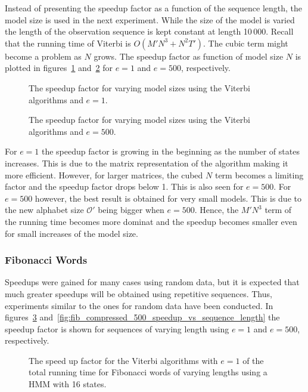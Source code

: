 Instead of presenting the speedup factor as a function of the sequence length,
the model size is used in the next experiment. While the size of the model
is varied the length of the observation sequence is kept constant at length
10\,000. Recall that the running time of Viterbi is $O(M' N^3 + N^2 T')$. The
cubic term might become a problem as $N$ grows. The speedup factor as function
of model size $N$ is plotted in figures~\ref{fig:speedup_vs_N}
and~\ref{fig:speedup_vs_N2} for $e = 1$ and $e = 500$,
respectively.

\begin{figure}
  \centering
  
  \caption{The speedup factor for varying model sizes using the Viterbi
    algorithms and $e = 1$.}
  \label{fig:speedup_vs_N}
\end{figure}

\begin{figure}
  \centering
  
  \caption{The speedup factor for varying model sizes using the Viterbi
    algorithms and $e=500$.}
  \label{fig:speedup_vs_N2}
\end{figure}

For $e = 1$ the speedup factor is growing in the beginning as the number of
states increases. This is due to the matrix representation of the algorithm
making it more efficient. However, for larger matrices, the cubed $N$ term
becomes a limiting factor and the speedup factor drops below 1. This is also
seen for $e = 500$. For $e = 500$ however, the best result is obtained for very
small models. This is due to the new alphabet size $\mathcal{O'}$ being
bigger when $e = 500$. Hence, the $M' N^3$ term of the running time becomes
more dominat and the speedup becomes smaller even for small increases of the
model size.

\subsubsection{Fibonacci Words}

Speedups were gained for many cases using random data, but it is
expected that much greater speedups will be obtained using repetitive
sequences. Thus, experiments similar to the ones for random data have been
conducted. In figures~\ref{fig:fib_compressed_1_speedup_vs_sequence_length}
and~\ref{fig:fib_compressed_500_speedup_vs_sequence_length} the speedup factor
is shown for sequences of varying length using $e = 1$ and $e = 500$, respectively.

\begin{figure}
  \centering
  
  \caption{The speed up factor for the Viterbi algorithms with $e = 1$ of the total
    running time for Fibonacci words of varying
    lengths using a HMM with 16 states.}
  \label{fig:fib_compressed_1_speedup_vs_sequence_length}
\end{figure}

